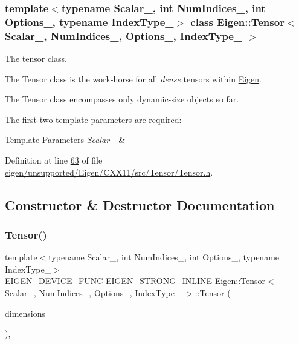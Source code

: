 \subsubsection*{template$<$typename Scalar\+\_\+, int Num\+Indices\+\_\+, int Options\+\_\+, typename Index\+Type\+\_\+$>$\newline
class Eigen\+::\+Tensor$<$ Scalar\+\_\+, Num\+Indices\+\_\+, Options\+\_\+, Index\+Type\+\_\+ $>$}

The tensor class. 

The Tensor class is the work-\/horse for all {\itshape dense} tensors within \hyperlink{namespace_eigen}{Eigen}.

The Tensor class encompasses only dynamic-\/size objects so far.

The first two template parameters are required\+: 
\begin{DoxyTemplParams}{Template Parameters}
{\em Scalar\+\_\+} & \\
\hline
\end{DoxyTemplParams}


Definition at line \hyperlink{eigen_2unsupported_2_eigen_2_c_x_x11_2src_2_tensor_2_tensor_8h_source_l00063}{63} of file \hyperlink{eigen_2unsupported_2_eigen_2_c_x_x11_2src_2_tensor_2_tensor_8h_source}{eigen/unsupported/\+Eigen/\+C\+X\+X11/src/\+Tensor/\+Tensor.\+h}.



\subsection{Constructor \& Destructor Documentation}
\mbox{\label{class_eigen_1_1_tensor_a6ef6b578cd0ca367842b0d8888e22195}} 
\subsubsection{\texorpdfstring{Tensor()}{Tensor()}\hspace{0.1cm}{\footnotesize\ttfamily [1/2]}}
{\footnotesize\ttfamily template$<$typename Scalar\+\_\+, int Num\+Indices\+\_\+, int Options\+\_\+, typename Index\+Type\+\_\+$>$ \\
E\+I\+G\+E\+N\+\_\+\+D\+E\+V\+I\+C\+E\+\_\+\+F\+U\+NC E\+I\+G\+E\+N\+\_\+\+S\+T\+R\+O\+N\+G\+\_\+\+I\+N\+L\+I\+NE \hyperlink{class_eigen_1_1_tensor}{Eigen\+::\+Tensor}$<$ Scalar\+\_\+, Num\+Indices\+\_\+, Options\+\_\+, Index\+Type\+\_\+ $>$\+::\hyperlink{class_eigen_1_1_tensor}{Tensor} (\begin{DoxyParamCaption}\item[{const \hyperlink{class_eigen_1_1array}{array}$<$ Index, Num\+Indices $>$ \&}]{dimensions }\end{DoxyParamCaption})\hspace{0.3cm}{\ttfamily [inline]}, {\ttfamily [explicit]}}

